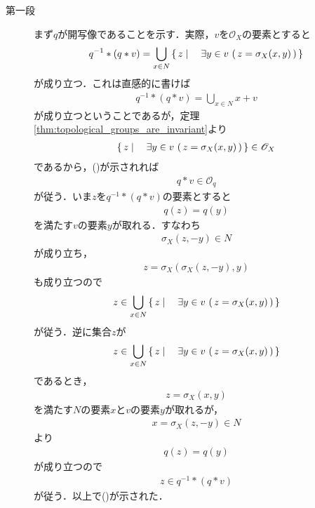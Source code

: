 	\begin{sketch}\mbox{}
		\begin{description}
			\item[第一段] まず$q$が開写像であることを示す．実際，$v$を$\mathscr{O}_X$の要素とすると
				\begin{align}
					q^{-1} \ast (q \ast v) = \bigcup_{x \in N} \left\{\, z \mid \quad \exists y \in v\, \left(\, z=\sigma_X(x,y)\, \right)\, \right\}
					\label{fom:thm_quotient_topological_vector_space_1}
				\end{align}
				が成り立つ．これは直感的に書けば
				\begin{align}
					q^{-1} \ast (q \ast v) = \bigcup_{x \in N} x + v
				\end{align}
				が成り立つということであるが，定理\ref{thm:topological_groups_are_invariant}より
				\begin{align}
					\left\{\, z \mid \quad \exists y \in v\, \left(\, z=\sigma_X(x,y)\, \right)\, \right\} \in \mathscr{O}_X
				\end{align}
				であるから，()が示されれば
				\begin{align}
					q \ast v \in \mathscr{O}_q
				\end{align}
				が従う．いま$z$を$q^{-1} \ast (q \ast v)$の要素とすると
				\begin{align}
					q(z) = q(y)
				\end{align}
				を満たす$v$の要素$y$が取れる．すなわち
				\begin{align}
					\sigma_X(z,-y) \in N
				\end{align}
				が成り立ち，
				\begin{align}
					z = \sigma_X\left(\sigma_X(z,-y),y\right)
				\end{align}
				も成り立つので
				\begin{align}
					z \in \bigcup_{x \in N} \left\{\, z \mid \quad \exists y \in v\, \left(\, z=\sigma_X(x,y)\, \right)\, \right\}
				\end{align}
				が従う．逆に集合$z$が
				\begin{align}
					z \in \bigcup_{x \in N} \left\{\, z \mid \quad \exists y \in v\, \left(\, z=\sigma_X(x,y)\, \right)\, \right\}
				\end{align}
				であるとき，
				\begin{align}
					z = \sigma_X(x,y)
				\end{align}
				を満たす$N$の要素$x$と$v$の要素$y$が取れるが，
				\begin{align}
					x = \sigma_X(z,-y) \in N
				\end{align}
				より
				\begin{align}
					q(z) = q(y)
				\end{align}
				が成り立つので
				\begin{align}
					z \in q^{-1} \ast (q \ast v)
				\end{align}
				が従う．以上で()が示された．
				

\end{description}
\end{sketch}
